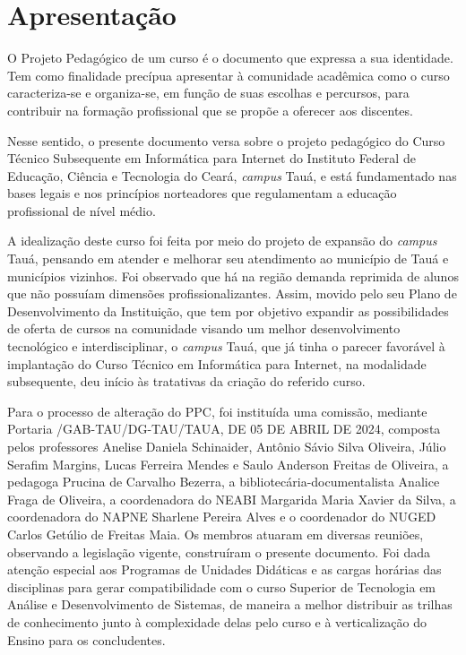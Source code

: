 
\chapter{Apresentação}


%  
 
 O Projeto Pedagógico de um curso é o documento que expressa a sua identidade.
 Tem como finalidade precípua apresentar à comunidade acadêmica como o curso
 caracteriza-se e organiza-se, em função de suas escolhas e percursos, para
 contribuir na formação profissional que se propõe a oferecer aos discentes.
 
 Nesse sentido, o presente documento versa sobre o projeto pedagógico do Curso
 Técnico Subsequente em Informática para Internet do Instituto Federal de
 Educação, Ciência e Tecnologia do Ceará, \textit{campus} Tauá, e está
 fundamentado nas bases legais e nos princípios norteadores que regulamentam a
 educação profissional de nível médio.
 
 
 A idealização deste curso foi feita por meio do projeto de expansão do
 \textit{campus} Tauá, pensando em atender e melhorar seu atendimento ao município
 de Tauá e municípios vizinhos. 
 Foi observado que há na região demanda reprimida de alunos que
 não possuíam dimensões profissionalizantes. Assim, movido pelo seu Plano de Desenvolvimento da Instituição, que tem por
 objetivo expandir as possibilidades de oferta de cursos na comunidade visando
 um melhor desenvolvimento tecnológico e interdisciplinar, o \textit{campus} Tauá, que já tinha o parecer favorável à implantação 
 do Curso Técnico em Informática para Internet, na modalidade subsequente, deu início às tratativas da criação do referido curso.
 
 
 Para o processo de alteração do PPC, foi instituída uma comissão, mediante
 Portaria /GAB-TAU/DG-TAU/TAUA, DE 05 DE ABRIL DE 2024, composta pelos professores
 Anelise Daniela Schinaider, Antônio Sávio Silva Oliveira, Júlio Serafim Margins, Lucas Ferreira Mendes e Saulo Anderson Freitas de
 Oliveira, a pedagoga Prucina de Carvalho Bezerra,  a  bibliotecária-documentalista 
Analice Fraga de Oliveira, a coordenadora do NEABI Margarida Maria Xavier da Silva, a coordenadora do NAPNE Sharlene Pereira Alves e o coordenador do NUGED Carlos Getúlio de Freitas Maia. Os membros atuaram  em diversas reuniões, observando a legislação vigente, construíram o
 presente documento. Foi dada atenção especial aos Programas de Unidades Didáticas
 e as cargas horárias das disciplinas para gerar compatibilidade com o curso Superior de Tecnologia em Análise e Desenvolvimento de Sistemas, de maneira a melhor distribuir as trilhas de conhecimento junto à complexidade delas pelo curso e à verticalização do Ensino para os concludentes.
 
